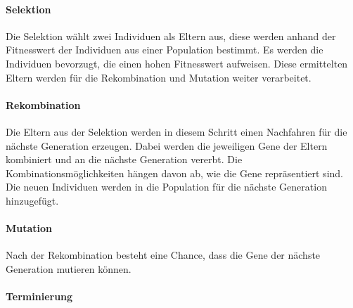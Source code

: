 \paragraph*{Selektion}
Die Selektion w{\"a}hlt zwei Individuen als Eltern aus, diese werden anhand der Fitnesswert der Individuen aus einer Population bestimmt. 
Es werden die Individuen bevorzugt, die einen hohen Fitnesswert aufweisen. Diese ermittelten Eltern werden f{\"u}r die Rekombination und Mutation weiter verarbeitet.

\paragraph*{Rekombination}
Die Eltern aus der Selektion werden in diesem Schritt einen Nachfahren f{\"u}r die n{\"a}chste Generation erzeugen. Dabei werden die jeweiligen Gene der Eltern kombiniert und an die n{\"a}chste Generation vererbt. Die Kombinationsm{\"o}glichkeiten h{\"a}ngen davon ab, wie die Gene repr{\"a}sentiert sind.
Die neuen Individuen werden in die Population f{\"u}r die n{\"a}chste Generation hinzugef{\"u}gt.


\paragraph*{Mutation}
Nach der Rekombination besteht eine Chance, dass die Gene der n{\"a}chste Generation mutieren k{\"o}nnen. 

\paragraph*{Terminierung}

